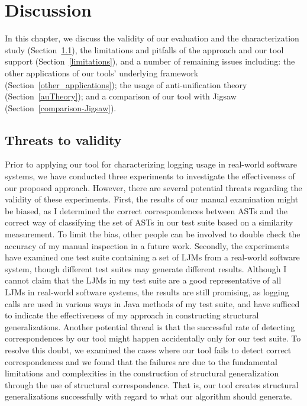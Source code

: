 \chapter{Discussion}  \label{diss}

In this chapter, we discuss the validity of our evaluation and the characterization study (Section~\ref{threads}), the limitations and pitfalls of the approach and our tool support (Section~\ref{limitations}), and a number of remaining issues including: the other applications of our tools' underlying framework (Section~\ref{other_applications}); the usage of anti-unification theory (Section~\ref{auTheory}); and a comparison of our tool with Jigsaw (Section~\ref{comparison-Jigsaw}).

\section{Threats to validity}  \label{threads}
Prior to applying our tool for characterizing logging usage in real-world software systems, we have conducted three experiments to investigate the effectiveness of our proposed approach. However, there are several potential threats regarding the validity of these experiments. First, the results of our manual examination might be biased, as I determined the correct correspondences between ASTs and the correct way of classifying the set of ASTs in our test suite based on a similarity measurement. To limit the bias, other people can be involved to double check the accuracy of my manual inspection in a future work. Secondly, the experiments have examined one test suite containing a set of LJMs from a real-world software system, though different test suites may generate different results. Although I cannot claim that the LJMs in my test suite are a good representative of all LJMs in real-world software systems, the results are still promising, as logging calls are used in various ways in Java methods of my test suite, and have sufficed to indicate the effectiveness of my approach in constructing structural generalizations. Another potential thread is that the successful rate of detecting correspondences by our tool might happen accidentally only for our test suite. To resolve this doubt, we examined the cases where our tool fails to detect correct correspondences and we found that the failures are due to the fundamental limitations and complexities in the construction of structural generalization through the use of structural correspondence. That is, our tool creates structural generalizations successfully with regard to what our algorithm should generate.
